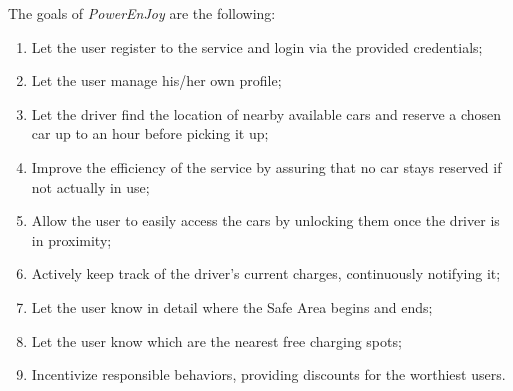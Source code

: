 The goals of \hbox{\emph{PowerEnJoy}} are the following:

\begin{enumerate}
\item Let the user register to the service and login via the provided credentials;
\item Let the user manage his/her own profile;
\item Let the driver find the location of nearby available cars and reserve a chosen car up to an hour before picking it up;
\item Improve the efficiency of the service by assuring that no car stays reserved if not actually in use;
\item Allow the user to easily access the cars by unlocking them once the driver is in proximity;
\item Actively keep track of the driver's current charges, continuously notifying it;
\item Let the user know in detail where the Safe Area begins and ends;
\item Let the user know which are the nearest free charging spots;
\item Incentivize responsible behaviors, providing discounts for the worthiest users.
\end{enumerate}